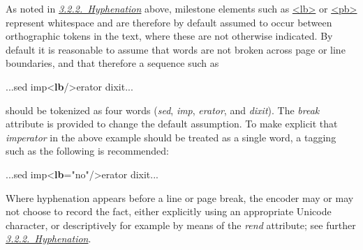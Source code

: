 As noted in \textit{\hyperref[COPU-2]{3.2.2.\ Hyphenation}} above, milestone elements such as \hyperref[TEI.lb]{<lb>} or \hyperref[TEI.pb]{<pb>} represent whitespace and are therefore by default assumed to occur between orthographic tokens in the text, where these are not otherwise indicated. By default it is reasonable to assume that words are not broken across page or line boundaries, and that therefore a sequence such as \par\bgroup{}\exampleFont \begin{shaded}\noindent\mbox{}...sed imp{<\textbf{lb}/>}erator dixit...\mbox{}\newline 
\end{shaded}\egroup\par \noindent  should be tokenized as four words (\textit{sed}, \textit{imp}, \textit{erator}, and \textit{dixit}). The {\itshape break} attribute is provided to change the default assumption. To make explicit that \textit{imperator} in the above example should be treated as a single word, a tagging such as the following is recommended: \par\bgroup{}\exampleFont \begin{shaded}\noindent\mbox{}...sed imp{<\textbf{lb}\hspace*{1em}{break}="{no}"/>}erator dixit...\mbox{}\newline 
\end{shaded}\egroup\par \noindent  Where hyphenation appears before a line or page break, the encoder may or may not choose to record the fact, either explicitly using an appropriate Unicode character, or descriptively for example by means of the {\itshape rend} attribute; see further \textit{\hyperref[COPU-2]{3.2.2.\ Hyphenation}}.
